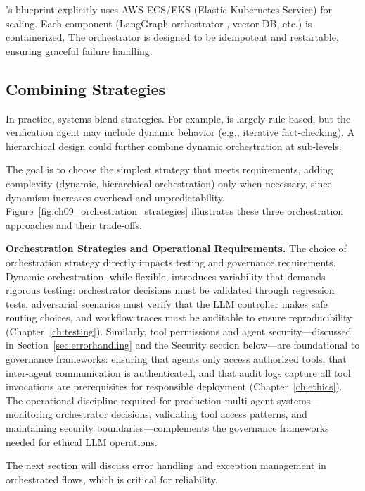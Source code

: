 \ishtar{}'s blueprint explicitly uses AWS ECS/EKS (Elastic Kubernetes Service) for scaling. Each component (LangGraph orchestrator \cite{langchain}, vector DB, etc.) is containerized. The orchestrator is designed to be idempotent and restartable, ensuring graceful failure handling.  

\subsection*{Combining Strategies}
In practice, systems blend strategies. For example, \ishtar{} is largely rule-based, but the verification agent may include dynamic behavior (e.g., iterative fact-checking). A hierarchical design could further combine dynamic orchestration at sub-levels.  

The goal is to choose the simplest strategy that meets requirements, adding complexity (dynamic, hierarchical orchestration) only when necessary, since dynamism increases overhead and unpredictability. Figure~\ref{fig:ch09_orchestration_strategies} illustrates these three orchestration approaches and their trade-offs.

\medskip
\noindent\textbf{Orchestration Strategies and Operational Requirements.} The choice of orchestration strategy directly impacts testing and governance requirements. Dynamic orchestration, while flexible, introduces variability that demands rigorous testing: orchestrator decisions must be validated through regression tests, adversarial scenarios must verify that the LLM controller makes safe routing choices, and workflow traces must be auditable to ensure reproducibility (Chapter~\ref{ch:testing}). Similarly, tool permissions and agent security---discussed in Section~\ref{sec:errorhandling} and the Security section below---are foundational to governance frameworks: ensuring that agents only access authorized tools, that inter-agent communication is authenticated, and that audit logs capture all tool invocations are prerequisites for responsible deployment (Chapter~\ref{ch:ethics}). The operational discipline required for production multi-agent systems---monitoring orchestrator decisions, validating tool access patterns, and maintaining security boundaries---complements the governance frameworks needed for ethical LLM operations.

The next section will discuss error handling and exception management in orchestrated flows, which is critical for reliability.  

